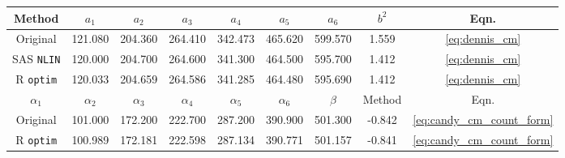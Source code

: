 
\begin{tabular}{ccccccccc}
\toprule
Method & $a_1$ & $a_2$ & $a_3$ & $a_4$ & $a_5$ & $a_6$ & $b^2$ & Eqn.\\
\midrule
Original \citep{kemp1986stochastic} & 121.080 & 204.360 & 264.410 & 342.473 & 465.620 & 599.570 & 1.559 & \ref{eq:dennis_cm}\\
SAS \verb+NLIN+ & 120.000 & 204.700 & 264.600 & 341.300 & 464.500 & 595.700 & 1.412 & \ref{eq:dennis_cm}\\
R \verb+optim+ & 120.033 & 204.659 & 264.586 & 341.285 & 464.480 & 595.690 & 1.412 & \ref{eq:dennis_cm}\\
\midrule $\alpha_1$ & $\alpha_2$ & $\alpha_3$ & $\alpha_4$ & $\alpha_5$ & $\alpha_6$ & $\beta$ & Method & Eqn. \\ \midrule
Original \citep{candy1991modeling} & 101.000 & 172.200 & 222.700 & 287.200 & 390.900 & 501.300 & -0.842 & \ref{eq:candy_cm_count_form}\\
R \verb+optim+ & 100.989 & 172.181 & 222.598 & 287.134 & 390.771 & 501.157 & -0.841 & \ref{eq:candy_cm_count_form}\\
\bottomrule
\end{tabular}